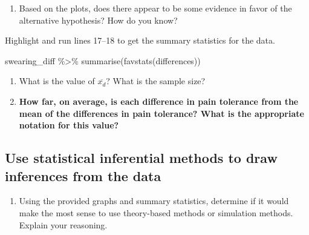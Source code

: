 \documentclass[
]{report}
\newenvironment{Shaded}{\begin{snugshade}}{\end{snugshade}}
\newcommand{\FunctionTok}[1]{\textcolor[rgb]{0.00,0.00,0.00}{#1}}
\newcommand{\NormalTok}[1]{#1}
\newcommand{\SpecialCharTok}[1]{\textcolor[rgb]{0.00,0.00,0.00}{#1}}
\providecommand{\tightlist}{%
  \setlength{\itemsep}{0pt}\setlength{\parskip}{0pt}}
\begin{document}
\begin{enumerate}
\def\labelenumi{\arabic{enumi}.}
\setcounter{enumi}{6}
\tightlist
\item
  Based on the plots, does there appear to be some evidence in favor of the alternative hypothesis? How do you know?
  \vspace{0.4in}
\end{enumerate}

Highlight and run lines 17--18 to get the summary statistics for the data.

\begin{Shaded}
\begin{Highlighting}[]
\NormalTok{swearing\_diff }\SpecialCharTok{\%\textgreater{}\%} 
    \FunctionTok{summarise}\NormalTok{(}\FunctionTok{favstats}\NormalTok{(differences))}
\end{Highlighting}
\end{Shaded}

\begin{enumerate}
\def\labelenumi{\arabic{enumi}.}
\setcounter{enumi}{7}
\item
  What is the value of \(\overline{x_d}\)? What is the sample size?
  \vspace{0.25in}
\item
  \textbf{How far, on average, is each difference in pain tolerance from the mean of the differences in pain tolerance? What is the appropriate notation for this value?}
\end{enumerate}

\vspace{0.5in}

\hypertarget{use-statistical-inferential-methods-to-draw-inferences-from-the-data-2}{%
\subsection*{Use statistical inferential methods to draw inferences from the data}\label{use-statistical-inferential-methods-to-draw-inferences-from-the-data-2}}

\begin{enumerate}
\def\labelenumi{\arabic{enumi}.}
\setcounter{enumi}{9}
\tightlist
\item
  Using the provided graphs and summary statistics, determine if it would make the most sense to use theory-based methods or simulation methods. Explain your reasoning.
\end{enumerate}
\end{document}
